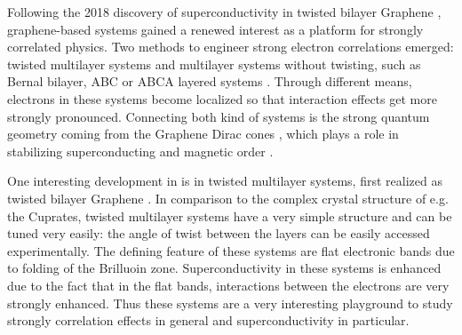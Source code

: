 \documentclass[../notes.tex]{subfiles}
\begin{document}

Following the 2018 discovery of superconductivity in twisted bilayer Graphene \cite{caoUnconventionalSuperconductivityMagicangle2018}, graphene-based systems gained a renewed interest as a platform for strongly correlated physics.
Two methods to engineer strong electron correlations emerged: twisted multilayer systems  \cite{caoUnconventionalSuperconductivityMagicangle2018, tanakaSuperfluidStiffnessMagicangle2025, tormaSuperconductivitySuperfluidityQuantum2022, andreiGrapheneBilayersTwist2020, xieTopologyBoundedSuperfluidWeight2020} and multilayer systems without twisting, such as Bernal bilayer, ABC or ABCA layered systems \cite{pantaleonSuperconductivityCorrelatedPhases2023}.
Through different means, electrons in these systems become localized so that interaction effects get more strongly pronounced.
Connecting both kind of systems is the strong quantum geometry coming from the Graphene Dirac cones \cite{wehlingDiracMaterials2014}, which plays a role in stabilizing superconducting \cite{liangBandGeometryBerry2017, tanakaSuperfluidStiffnessMagicangle2025} and magnetic order \cite{abouelkomsanQuantumMetricInduced2023, liuOrbitalMagneticStates2021}.


One interesting development in is in twisted multilayer systems, first realized as twisted bilayer Graphene \cite{caoUnconventionalSuperconductivityMagicangle2018}.
In comparison to the complex crystal structure of e.g. the Cuprates, twisted multilayer systems have a very simple structure and can be tuned very easily: the angle of twist between the layers can be easily accessed experimentally.
The defining feature of these systems are flat electronic bands due to folding of the Brilluoin zone.
Superconductivity in these systems is enhanced due to the fact that in the flat bands, interactions between the electrons are very strongly enhanced.
Thus these systems are a very interesting playground to study strongly correlation effects in general and superconductivity in particular.
\end{document}
